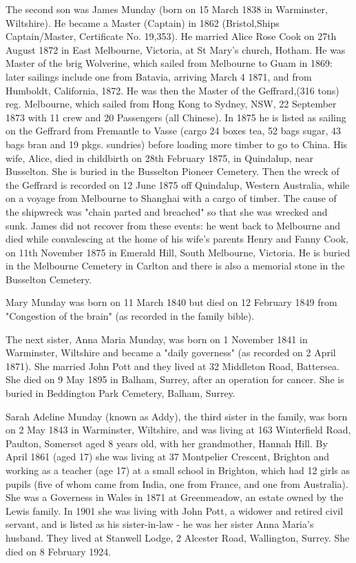     The second son was James Munday (born on 15 March 1838 in Warminster, Wiltshire).  He became a Master (Captain) in 1862 (Bristol,Ships Captain/Master, Certificate No. 19,353).  He married Alice Rose Cook on 27th August 1872 in	East Melbourne, Victoria, at St Mary's church, Hotham. He was Master of the brig Wolverine, which sailed from Melbourne to Guam in 1869: later sailings include one from Batavia, arriving March 4 1871, and from Humboldt, California, 1872. He was then the Master of the Geffrard,(316 tons) reg. Melbourne, which sailed from Hong Kong to Sydney, NSW, 22 September 1873 with 11 crew and 20 Passengers (all Chinese). In 1875 he is listed as sailing on the Geffrard from Fremantle to Vasse (cargo 24 boxes tea, 52 bags sugar, 43 bags bran and 19 pkgs. sundries) before loading more timber to go to China. His wife, Alice, died in childbirth on 28th February 1875, in Quindalup, near Busselton. She is buried in the Busselton Pioneer Cemetery.  Then the wreck of the Geffrard is recorded on 12 June 1875 off Quindalup, Western Australia, while on a voyage from Melbourne to Shanghai with a cargo of timber. The cause of the shipwreck was "chain parted and breached" so that she was wrecked and sunk. James did not recover from these events: he went back to Melbourne and died while convalescing at the home of his wife's parents Henry and Fanny Cook, on 11th November 1875 in Emerald Hill, South Melbourne, Victoria. He is buried in the Melbourne Cemetery in Carlton and there is also a memorial stone in the Busselton Cemetery.  

Mary Munday was born on 11 March 1840 but died on 12 February 1849 from	"Congestion of the brain" (as recorded in the family bible). 

The next sister, Anna Maria Munday, was born on 1 November 1841 in Warminster, Wiltshire and became a "daily governess" (as recorded on 2 April 1871). She married John Pott and they lived at 32 Middleton Road, Battersea. She died on	9 May 1895 in Balham, Surrey, after an operation for cancer. She is buried in Beddington Park Cemetery, Balham, Surrey.  

Sarah Adeline Munday (known as Addy), the third sister in the family, was  born on 2 May 1843 in Warminster, Wiltshire, and was living at 163 Winterfield Road, Paulton, Somerset aged 8 years old, with her grandmother, Hannah Hill. By April 1861 (aged 17) she was living at 37 Montpelier Crescent, Brighton and working as a teacher (age 17) at a small school in Brighton, which had 12 girls as pupils (five of whom came from India, one from France, and one from Australia). She was a Governess in Wales in 1871 at Greenmeadow, an estate owned by the Lewis family. In 1901 she was living with John Pott, a widower and retired civil servant, and is listed as his sister-in-law - he was her sister Anna Maria's husband. They lived at Stanwell Lodge, 2 Alcester Road, Wallington, Surrey. She died on 8 February 1924. 

